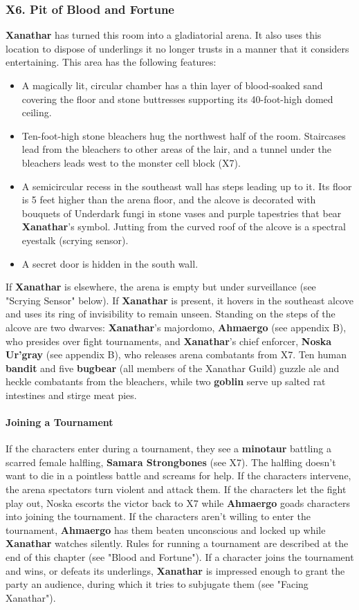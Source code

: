 \documentclass[10pt,a4paper,twoside,twocolumn,openany,nodeprecatedcode]{dndbook}
\begin{document}
\subsubsection{X6. Pit of Blood and Fortune}
\textbf{Xanathar} has turned this room into a gladiatorial arena. It also uses this location to dispose of underlings it no longer trusts in a manner that it considers entertaining.
This area has the following features:
\begin{itemize}

\item A magically lit, circular chamber has a thin layer of blood-soaked sand covering the floor and stone buttresses supporting its 40-foot-high domed ceiling.
\item Ten-foot-high stone bleachers hug the northwest half of the room. Staircases lead from the bleachers to other areas of the lair, and a tunnel under the bleachers leads west to the monster cell block (X7).
\item A semicircular recess in the southeast wall has steps leading up to it. Its floor is 5 feet higher than the arena floor, and the alcove is decorated with bouquets of Underdark fungi in stone vases and purple tapestries that bear \textbf{Xanathar}'s symbol. Jutting from the curved roof of the alcove is a spectral eyestalk (scrying sensor).
\item A secret door is hidden in the south wall.
\end{itemize}


If \textbf{Xanathar} is elsewhere, the arena is empty but under surveillance (see "Scrying Sensor" below).
If \textbf{Xanathar} is present, it hovers in the southeast alcove and uses its ring of invisibility to remain unseen. Standing on the steps of the alcove are two dwarves: \textbf{Xanathar}'s majordomo, \textbf{Ahmaergo} (see appendix B), who presides over fight tournaments, and \textbf{Xanathar}'s chief enforcer, \textbf{Noska Ur'gray} (see appendix B), who releases arena combatants from X7. Ten human \textbf{bandit} and five \textbf{bugbear} (all members of the Xanathar Guild) guzzle ale and heckle combatants from the bleachers, while two \textbf{goblin} serve up salted rat intestines and stirge meat pies.
\paragraph{Joining a Tournament}
If the characters enter during a tournament, they see a \textbf{minotaur} battling a scarred female halfling, \textbf{Samara Strongbones} (see X7). The halfling doesn't want to die in a pointless battle and screams for help. If the characters intervene, the arena spectators turn violent and attack them. If the characters let the fight play out, Noska escorts the victor back to X7 while \textbf{Ahmaergo} goads characters into joining the tournament. If the characters aren't willing to enter the tournament, \textbf{Ahmaergo} has them beaten unconscious and locked up while \textbf{Xanathar} watches silently.
Rules for running a tournament are described at the end of this chapter (see "Blood and Fortune"). If a character joins the tournament and wins, or defeats its underlings, \textbf{Xanathar} is impressed enough to grant the party an audience, during which it tries to subjugate them (see "Facing Xanathar").
\end{document}
